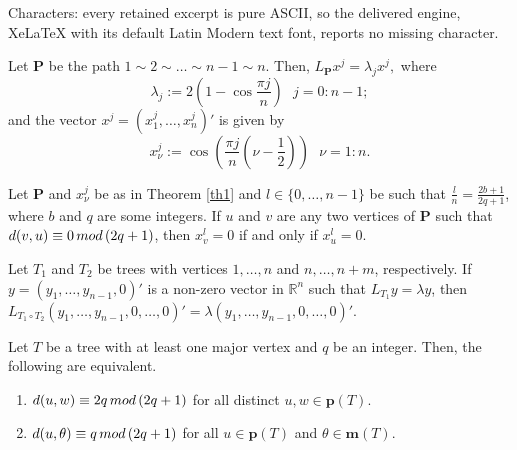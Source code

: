 \documentclass[10pt,a4paper]{amsart}
\def\m{\mathbf{m}}
\def\pt{\mathbf{p}}
\newcommand{\p}{{\mathbf{P}}}
\newcommand{\rr}{\mathbb{R}}
\begin{document}
Characters: every retained excerpt is pure ASCII, so the delivered engine, XeLaTeX with its default Latin Modern text font, reports no missing character.
\begin{theorem}\label{th1}
    Let $\p$ be the path $1 \sim 2 \sim \dotsc \sim n-1 \sim n$.
    Then,
    \(L_\p x^j=\lambda_j x^j,\)
    where 
    \begin{equation} \label{pn}
    \lambda_j:=2\left(1-\cos \frac{\pi j}{n}\right) ~~~j=0:n-1;
    \end{equation}
    and the vector $x^j=(x^j_{1},\dotsc,x^j_{n})'$ is given by
    \begin{equation} \label{xj}
    x^j_\nu:=\cos \left(\frac{\pi j}{n} \left (\nu-\frac{1}{2}\right ) \right) ~~~\nu=1:n.
    \end{equation}
\end{theorem}

\begin{lemma}\label{lem1}
Let $\p$ and $x_{\nu}^j$ be as in Theorem \ref{th1} and
$l \in \{0,\dotsc,n-1\}$ be such that
$\frac{l}{n}=\frac{2b+1}{2q+1}$,
where $b$ and $q$ are some integers.
If $u$ and $v$ are any two vertices of $\p$ such that
    $d(v,u) \equiv 0\,{\rm{mod}}\,(2q+1)$,
then $x^l_v=0$ if and only if $x^l_u=0$. 
\end{lemma}

\begin{lemma}\label{v1}
    Let $T_1$ and $T_2$ be trees with vertices $1,\dotsc,n$ and 
    $n,\dotsc,n+m$, respectively. If
  $y=(y_1,\dotsc,y_{n-1},0)'$ is a non-zero vector in $\rr^{n}$ such that
  $L_{T_1}y=\lambda y$, then $L_{T_{1} \circ T_2}(y_1,\dotsc,y_{n-1},0,\dotsc,0)'=\lambda (y_1,\dotsc,y_{n-1},0,\dotsc,0)'$.
\end{lemma}

\begin{lemma}\label{equiv}
  Let $T$ be a tree with at least one major vertex and $q$ be an integer. Then, the following are equivalent.
  \begin{enumerate}
      \item[\rm{(i)}] $d(u,w) \equiv 2q\,{\rm{mod}}\,(2q+1)$ for all distinct $u,w \in \pt(T)$.
      \item[\rm{(ii)}] $d(u,\theta) \equiv q\, {\rm{mod}}\, (2q+1)$ for all $u \in \pt(T)$ and $\theta \in \m(T)$.
  \end{enumerate}
  \end{lemma}
\end{document}
